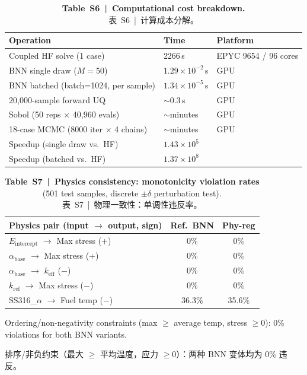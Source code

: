 \documentclass[11pt,a4paper]{article}
\newcommand{\keff}{\ensuremath{k_{\mathrm{eff}}}}
\newcommand{\Eint}{\ensuremath{E_{\mathrm{intercept}}}}
\newcommand{\abase}{\ensuremath{\alpha_{\mathrm{base}}}}
\newcommand{\kref}{\ensuremath{k_{\mathrm{ref}}}}
\begin{document}
\begin{table}[htbp]
\centering
\caption{\textbf{Table~S6~|~Computational cost breakdown.}\\
\small 表~S6~|~计算成本分解。}
\label{tab:S6}
\smallskip
\small
\begin{tabular}{lll}
\toprule
Operation & Time & Platform \\
\midrule
Coupled HF solve (1 case) & 2266\,s & EPYC 9654 / 96 cores \\
BNN single draw ($M=50$) & $1.29\times10^{-2}$\,s & GPU \\
BNN batched (batch=1024, per sample) & $1.34\times10^{-5}$\,s & GPU \\
20,000-sample forward UQ & ${\sim}0.3$\,s & GPU \\
Sobol (50 reps $\times$ 40,960 evals) & ${\sim}$minutes & GPU \\
18-case MCMC (8000 iter $\times$ 4 chains) & ${\sim}$minutes & GPU \\
\midrule
Speedup (single draw vs.\ HF) & $1.43\times10^{5}$ & \\
Speedup (batched vs.\ HF) & $1.37\times10^{8}$ & \\
\bottomrule
\end{tabular}
\end{table}

\begin{table}[htbp]
\centering
\caption{\textbf{Table~S7~|~Physics consistency: monotonicity violation
rates} (501 test samples, discrete $\pm\delta$ perturbation test).\\
\small 表~S7~|~物理一致性：单调性违反率。}
\label{tab:S7}
\smallskip
\small
\begin{tabular}{lcc}
\toprule
Physics pair (input $\to$ output, sign) & Ref.\ BNN & Phy-reg \\
\midrule
\Eint{} $\to$ Max stress (+)     & 0\% & 0\% \\
\abase{} $\to$ Max stress (+)    & 0\% & 0\% \\
\abase{} $\to$ \keff{} ($-$)     & 0\% & 0\% \\
\kref{} $\to$ Max stress ($-$)   & 0\% & 0\% \\
SS316\_$\alpha$ $\to$ Fuel temp ($-$) & 36.3\% & 35.6\% \\
\bottomrule
\end{tabular}

\smallskip
Ordering/non-negativity constraints (max $\geq$ average temp, stress $\geq 0$):
0\% violations for both BNN variants.

排序/非负约束（最大 $\geq$ 平均温度，应力 $\geq 0$）：两种 BNN 变体均为 0\% 违反。
\end{table}
\end{document}
